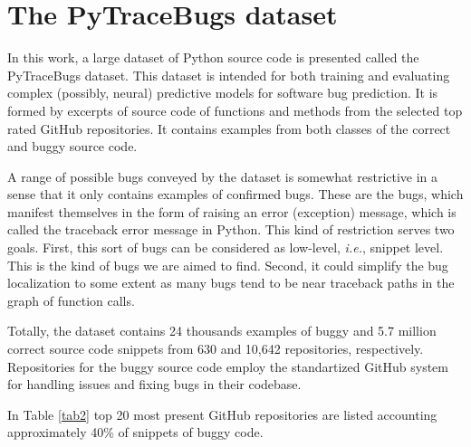 \documentclass[10pt,conference]{IEEEtran}
\begin{document}
\section{The PyTraceBugs dataset}\label{sec3}

In this work, a large dataset of Python source code is presented called the PyTraceBugs dataset. This dataset is intended for both training and evaluating
complex (possibly, neural) predictive models for software bug prediction. It is formed by excerpts of source code of functions
and methods from the selected top rated GitHub repositories. It contains examples from both classes
of the correct and buggy source code. 

A range of possible bugs conveyed by the dataset is somewhat restrictive in a sense
that it only contains examples of confirmed bugs. These are the bugs, 
which manifest themselves in the form of raising an error (exception) message, which is called the traceback error message
in Python. This kind of restriction serves two goals. First, this sort of bugs can be considered as low-level, \textit{i.e.}, snippet level. This is the kind of bugs we are aimed to find.
Second, it could simplify the bug localization to some extent as many bugs tend to be near traceback paths
in the graph of function calls. 

Totally, the dataset contains 24 thousands examples of buggy and 5.7 million correct source code snippets from 630 and 10,642 repositories, respectively.
Repositories for the buggy source code employ the standartized GitHub system for handling issues and fixing bugs in their codebase.

In Table \ref{tab2} top 20 most present GitHub repositories are listed accounting approximately 40\% of snippets of buggy code.
\end{document}
